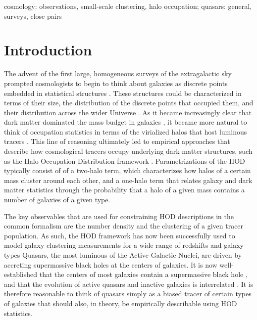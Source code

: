 \documentclass[useAMS,usenatbib]{mn2e}
\begin{document}
 \begin{keywords}
 cosmology: observations, small-scale clustering, halo occupation; quasars: general, surveys, close pairs
 \end{keywords}

\section{Introduction}
\label{intro}
The advent of the first large, homogeneous surveys of the extragalactic sky prompted
cosmologists to begin to think about galaxies as discrete points embedded in 
statistical structures \citep[e.g.][]{nsz62,ns74}. These structures could
be characterized in terms of their size, the distribution of the discrete points
that occupied them, and their distribution across the wider Universe
 \citep[see, e.g. ][for a review]{cs02}. As it became increasingly clear
 that dark matter dominated the mass budget in galaxies \citep[e.g.][]{Roo72,Ost74,Rub78}, it became more natural
 to think of occupation statistics in terms of the virialized halos that host 
 luminous tracers \citep[e.g.][]{Whi78}.
This line of reasoning ultimately led to empirical approaches that describe how 
cosmological tracers occupy underlying dark matter structures, such as the Halo 
Occupation Distribution framework \citep[HOD; e.g., ][and references therein]{bw02,zh07}.
Parametrizations of the HOD typically consist of of a two-halo term, which characterizes how halos of a certain
mass cluster around each other, and a one-halo term that relates galaxy and dark matter statistics through the
probability that a halo of a given mass contains a number of galaxies of a given
type. 

The key observables that are used for constraining HOD descriptions in the common formalism
are the number density and the clustering of a given tracer population. 
As such, the HOD framework has now been successfully used to model galaxy
clustering measurements for a wide range of redshifts and galaxy
types \citep[e.g.,][]{2dFsurv,daw16}
Quasars, the most luminous of the Active Galactic Nuclei, are driven by accreting
supermassive black holes at the centers of galaxies. It is now well-established that the centers of most galaxies 
contain a supermassive black hole \citep[e.g.][]{Kor95}, and that the evolution of active quasars and inactive 
galaxies is interrelated \citep[e.g.][]{Kau00}. It is therefore reasonable to think of quasars simply as a biased tracer
of certain types of galaxies that should also, in theory, be empirically describable using HOD statistics.
\end{document}
